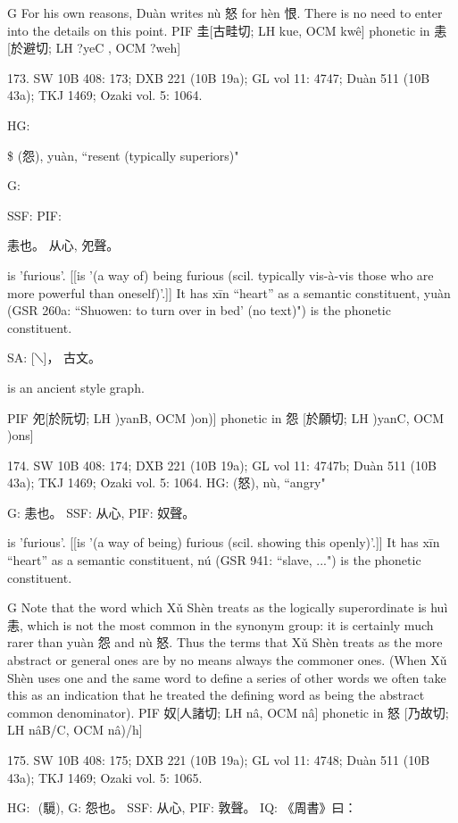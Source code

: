 G	For his own reasons, Duàn writes nù 怒 for hèn 恨. There is no need to enter into the details on this point.
PIF     圭[古畦切; LH kue, OCM kwê] phonetic in 恚 [於避切; LH ?yeC , OCM ?weh]

173. SW 10B 408: 173; DXB 221 (10B 19a); GL vol 11: 4747; Duàn 511 (10B 43a); TKJ 1469; Ozaki vol. 5: 1064.


HG:

\$ (怨), yuàn, ``resent (typically superiors)"

G:

SSF: PIF:

恚也。
从心,
夗聲。

is 'furious'. [[is '(a way of) being furious (scil. typically vis-à-vis those who are more powerful than oneself)'.]]
It has xīn ``heart'' as a semantic constituent,
yuàn (GSR 260a: ``Shuowen: to turn over in bed' (no text)") is the phonetic constituent.




SA:	[⟍]， 
古文。

is an ancient style graph.

PIF     夗[於阮切; LH )yanB, OCM )on)] phonetic in 怨 [於願切; LH )yanC, OCM )ons]

174. SW 10B 408: 174; DXB 221 (10B 19a); GL vol 11: 4747b; Duàn 511 (10B 43a); TKJ 1469; Ozaki vol. 5: 1064.
HG:             (怒), nù, ``angry"

G:	恚也。
SSF: 从心,
PIF: 奴聲。

is 'furious'. [[is '(a way of being) furious (scil. showing this openly)'.]]
It has xīn ``heart'' as a semantic constituent,
nú (GSR 941: ``slave, ...") is the phonetic constituent.

G Note that the word which Xǔ Shèn treats as the logically superordinate is huì 恚, which is not the most common in the synonym group: it is certainly much rarer than yuàn 怨 and nù 怒. Thus the terms that Xǔ Shèn treats as the more abstract or general ones are by no means always the commoner ones. (When Xǔ Shèn uses one and the same word to define a series of other words we often take this as an indication that he treated the defining word as being the abstract common denominator).
PIF    奴[人諸切; LH nâ, OCM nâ] phonetic in 怒 [乃故切; LH nâB/C, OCM nâ)/h]

175. SW 10B 408: 175; DXB 221 (10B 19a); GL vol 11: 4748; Duàn 511 (10B 43a); TKJ 1469; Ozaki vol. 5: 1065.

HG:  (䮭),
G:	怨也。
SSF: 从心,
PIF: 敦聲。
IQ:	《周書》曰：


